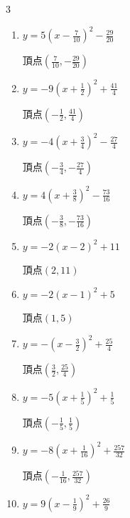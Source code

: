 \begin{multicols}{3}
\begin{enumerate}
        $\displaystyle 頂点\left( -\frac{1}{2} , -\frac{1}{4} \right)$

  \item $\displaystyle y=5\left( x-\frac{7}{10}\right)^{2}-\frac{29}{20}$

        $\displaystyle 頂点\left( \frac{7}{10} , -\frac{29}{20} \right)$

\columnbreak %

  \item $\displaystyle y=-9\left( x+\frac{1}{2}\right)^{2}+\frac{41}{4}$

        $\displaystyle 頂点\left( -\frac{1}{2} , \frac{41}{4} \right)$

  \item $\displaystyle y=-4\left( x+\frac{3}{4}\right)^{2}-\frac{27}{4}$

        $\displaystyle 頂点\left( -\frac{3}{4} , -\frac{27}{4} \right)$

  \item $\displaystyle y=4\left( x+\frac{3}{8}\right)^{2}-\frac{73}{16}$

        $\displaystyle 頂点\left( -\frac{3}{8} , -\frac{73}{16} \right)$

  \item $\displaystyle y=-2\left( x-2\right)^{2}+11$

        $\displaystyle 頂点\left( 2 , 11 \right)$

  \item $\displaystyle y=-2\left( x-1\right)^{2}+5$

        $\displaystyle 頂点\left( 1 , 5 \right)$

  \item $\displaystyle y=-\left( x-\frac{3}{2}\right)^{2}+\frac{25}{4}$

        $\displaystyle 頂点\left( \frac{3}{2} , \frac{25}{4} \right)$

  \item $\displaystyle y=-5\left( x+\frac{1}{5}\right)^{2}+\frac{1}{5}$

        $\displaystyle 頂点\left( -\frac{1}{5} , \frac{1}{5} \right)$

  \item $\displaystyle y=-8\left( x+\frac{1}{16}\right)^{2}+\frac{257}{32}$

        $\displaystyle 頂点\left( -\frac{1}{16} , \frac{257}{32} \right)$

  \item $\displaystyle y=9\left( x-\frac{1}{9}\right)^{2}+\frac{26}{9}$


\end{enumerate}
\end{multicols}
